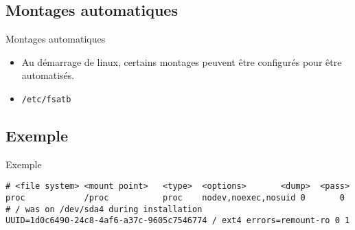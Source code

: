 \begin{frame}[containsverbatim]{\sectitle}
\def\subsectitle{Montages automatiques}
\subsection{\subsectitle}
\begin{block}{\subsectitle}
\begin{itemize}
    \item Au démarrage de linux, certains montages peuvent être configurés pour
        être automatisés. 
    \item \verb+/etc/fsatb+
\end{itemize}
\end{block}


\def\subsectitle{Exemple}
\subsection{\subsectitle}
\begin{exampleblock}{\subsectitle}
\begin{verbatim}
# <file system> <mount point>   <type>  <options>       <dump>  <pass>
proc            /proc           proc    nodev,noexec,nosuid 0       0
# / was on /dev/sda4 during installation 
UUID=1d0c6490-24c8-4af6-a37c-9605c7546774 / ext4 errors=remount-ro 0 1
\end{verbatim}
\end{exampleblock}

\end{frame}


